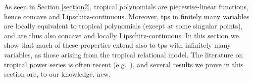 

As seen in Section \ref{section2}, tropical polynomials are piecewise-linear functions, hence concave and Lipschitz-continuous. Moreover, tps in finitely many variables are locally equivalent to tropical polynomials (except at some singular points), and are thus also concave and locally Lipschitz-continuous.
In this section we show that much of these properties extend also to tps with infinitely many variables, as those arising from the tropical relational model. %
The literature on tropical power series is often recent (e.g.~\cite{Porzio2021}), and several results we prove in this section are, to our knowledge, new.
%
%

